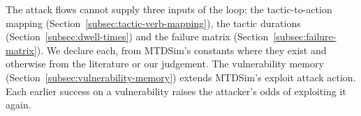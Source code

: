 \documentclass{cshonours}
\begin{document}
The attack flows cannot supply three inputs of the loop: the
tactic-to-action mapping (Section~\ref{subsec:tactic-verb-mapping}), the
tactic durations (Section~\ref{subsec:dwell-times}) and the failure matrix
(Section~\ref{subsec:failure-matrix}). We declare each, from MTDSim's
constants where they exist and otherwise from the literature or our
judgement. The vulnerability memory (Section~\ref{subsec:vulnerability-memory})
extends MTDSim's exploit attack action. Each earlier success on a
vulnerability raises the attacker's odds of exploiting it again.
\end{document}
